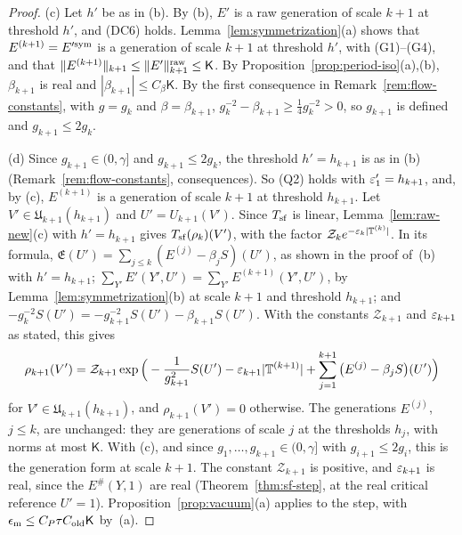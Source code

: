 \begin{proof}
(c) Let $h'$ be as in (b). By (b), $E'$ is a raw generation of scale $k+1$ at threshold $h'$, and (DC6) holds. Lemma~\ref{lem:symmetrization}(a) shows that $E^{(k+1)}=E'^{\rm sym}$ is a generation of scale $k+1$ at threshold $h'$, with (G1)--(G4), and that $\|E^{(k+1)}\|_{k+1}\le\|E'\|^{\rm raw}_{k+1}\le\mathsf K$. By Proposition~\ref{prop:period-iso}(a),(b), $\beta_{k+1}$ is real and $|\beta_{k+1}|\le C_\beta\mathsf K$. By the first consequence in Remark~\ref{rem:flow-constants}, with $g=g_k$ and $\beta=\beta_{k+1}$, $g_k^{-2}-\beta_{k+1}\ge\frac14g_k^{-2}>0$, so $g_{k+1}$ is defined and $g_{k+1}\le2g_k$.

(d) Since $g_{k+1}\in(0,\gamma]$ and $g_{k+1}\le2g_k$, the threshold $h'=h_{k+1}$ is as in (b) (Remark~\ref{rem:flow-constants}, consequences). So (Q2) holds with $\varepsilon'_1=h_{k+1}$, and, by (c), $E^{(k+1)}$ is a generation of scale $k+1$ at threshold $h_{k+1}$. Let $V'\in\mathfrak U_{k+1}(h_{k+1})$ and $U'=U_{k+1}(V')$. Since $T_{\rm sf}$ is linear, Lemma~\ref{lem:raw-new}(c) with $h'=h_{k+1}$ gives $T_{\rm sf}(\rho_k)(V')$, with the factor $\mathcal Z_ke^{-\varepsilon_k|\mathbb T^{(k)}|}$. In its formula, $\mathfrak E(U')=\sum_{j\le k}(E^{(j)}-\beta_jS)(U')$, as shown in the proof of~(b) with $h'=h_{k+1}$; $\sum_{Y'}E'(Y',U')=\sum_{Y'}E^{(k+1)}(Y',U')$, by Lemma~\ref{lem:symmetrization}(b) at scale $k+1$ and threshold $h_{k+1}$; and $-g_k^{-2}S(U')=-g_{k+1}^{-2}S(U')-\beta_{k+1}S(U')$. With the constants $\mathcal Z_{k+1}$ and $\varepsilon_{k+1}$ as stated, this gives
\[
\rho_{k+1}(V')=\mathcal Z_{k+1}\exp\Big(-\frac1{g_{k+1}^2}S(U')-\varepsilon_{k+1}|\mathbb T^{(k+1)}|+\sum_{j=1}^{k+1}\big(E^{(j)}-\beta_jS\big)(U')\Big)
\]
for $V'\in\mathfrak U_{k+1}(h_{k+1})$, and $\rho_{k+1}(V')=0$ otherwise. The generations $E^{(j)}$, $j\le k$, are unchanged: they are generations of scale $j$ at the thresholds $h_j$, with norms at most $\mathsf K$. With (c), and since $g_1,\dots,g_{k+1}\in(0,\gamma]$ with $g_{i+1}\le2g_i$, this is the generation form at scale $k+1$. The constant $\mathcal Z_{k+1}$ is positive, and $\varepsilon_{k+1}$ is real, since the $E^\#(Y,1)$ are real (Theorem~\ref{thm:sf-step}, at the real critical reference $U'=1$). Proposition~\ref{prop:vacuum}(a) applies to the step, with $\epsilon_{\rm m}\le C_P\tau C_{\rm old}\mathsf K$ by~(a).
\end{proof}

